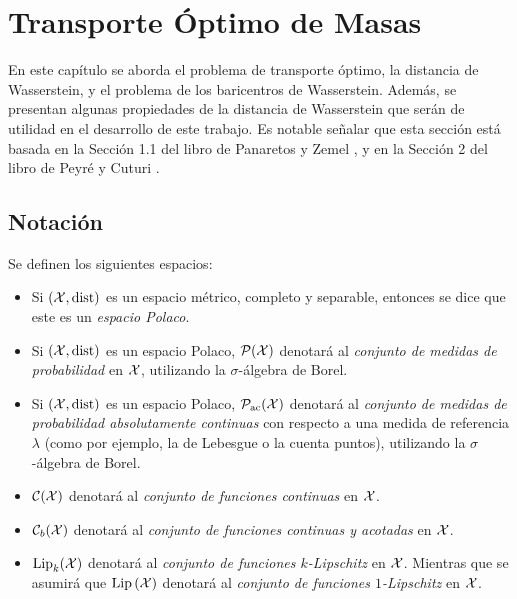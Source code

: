 \chapter{Transporte Óptimo de Masas}\label{chap:transporte-optimo-de-masas}
{

	En este capítulo se aborda el problema de transporte óptimo, la distancia de Wasserstein, y el problema de los baricentros de Wasserstein. Además, se presentan algunas propiedades de la distancia de Wasserstein que serán de utilidad en el desarrollo de este trabajo.
	Es notable señalar que esta sección está basada en la Sección 1.1 del libro de Panaretos y Zemel \cite{panaretos2020invitation}, y en la Sección 2 del libro de Peyré y Cuturi \cite{peyre2019computational}.

	\section*{Notación}\label{sec:notacion}
	{
		\begin{definition}
			Se definen los siguientes espacios:
			\begin{itemize}
				\item Si $(\cX, \dist)$ es un espacio métrico, completo y separable, entonces se dice que este es un \emph{espacio Polaco}.
				\item Si $(\cX, \dist)$ es un espacio Polaco, $\ProbSpace[\cX]$ denotará al \emph{conjunto de medidas de probabilidad} en $\cX$, utilizando la $\sigma$-álgebra de Borel.
				\item Si $(\cX, \dist)$ es un espacio Polaco, $\ProbSpaceAC[\cX]$ denotará al \emph{conjunto de medidas de probabilidad absolutamente continuas} con respecto a una medida de referencia $\lambda$ (como por ejemplo, la de Lebesgue o la cuenta puntos), utilizando la $\sigma$-álgebra de Borel.
				\item $\mathcal{C}(\cX)$ denotará al \emph{conjunto de funciones continuas} en $\cX$.
				\item $\mathcal{C}_b(\cX)$ denotará al \emph{conjunto de funciones continuas y acotadas} en $\cX$.
				\item ${\Lip}_{k}(\cX)$ denotará al \emph{conjunto de funciones $k$-Lipschitz} en $\cX$. Mientras que se asumirá que $\Lip[\cX]$ denotará al \emph{conjunto de funciones $1$-Lipschitz} en $\cX$. 
			\end{itemize}
		\end{definition}

}}
